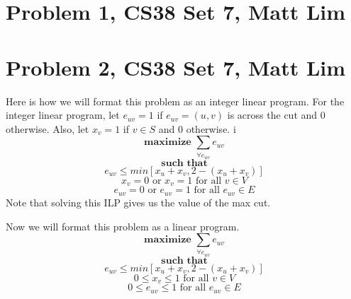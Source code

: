 \documentclass{article}
\begin{document}
\section*{Problem 1, CS38 Set 7, Matt Lim}

\newpage

\section*{Problem 2, CS38 Set 7, Matt Lim}
Here is how we will format this problem as an integer linear program. For the
integer linear program, let $e_{uv} = 1$ if
$e_{uv} = (u,v)$ is across the cut and $0$ otherwise. Also, let $x_v = 1$ if
$v \in S$ and $0$ otherwise.
i\[ \textbf{maximize } \sum_{\forall e_{uv}} e_{uv} \]
\[ \textbf{such that} \]
\[ e_{uv} \leq min[x_u + x_v, 2 - (x_u + x_v)] \]
\[ x_v = 0 \text{ or } x_v = 1 \text{ for all $v \in V$} \]
\[ e_{uv} = 0 \text{ or } e_{uv} = 1 \text{ for all $e_{uv} \in E$} \]
Note that solving this ILP gives us the value of the max cut.

Now we will format this problem as a linear program.
\[ \textbf{maximize } \sum_{\forall e_{uv}} e_{uv} \]
\[ \textbf{such that} \]
\[ e_{uv} \leq min[x_u + x_v, 2 - (x_u + x_v)] \]
\[ 0 \leq x_v \leq 1 \text{ for all $v \in V$} \]
\[ 0 \leq e_{uv} \leq 1 \text{ for all $e_{uv} \in E$} \]

\newpage

\end{document}
